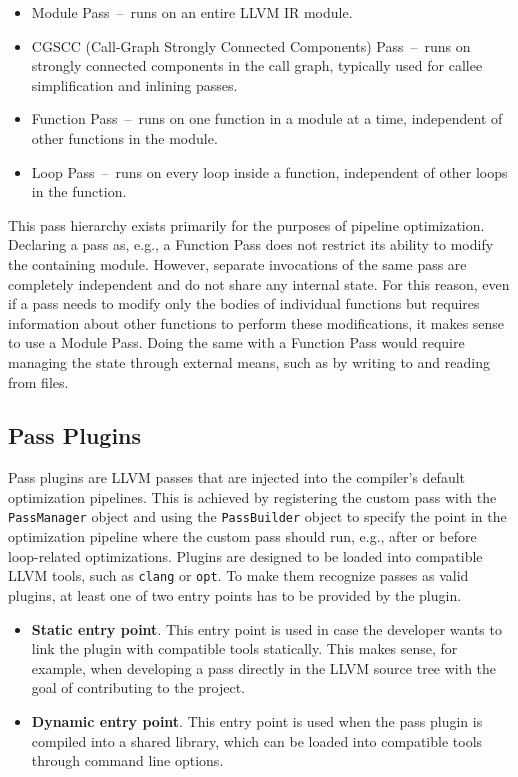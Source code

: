 \begin{itemize}
    \item Module Pass \,--\, runs on an entire LLVM IR module.
    \item CGSCC (Call-Graph Strongly Connected Components) Pass \,--\, runs on strongly connected components in the call graph, typically used for callee simplification and inlining passes.
    \item Function Pass \,--\, runs on one function in a module at a time, independent of other functions in the module.
    \item Loop Pass \,--\, runs on every loop inside a function, independent of other loops in the function.
\end{itemize}


This pass hierarchy exists primarily for the purposes of pipeline optimization. Declaring a pass as, e.g., a Function Pass does not restrict its ability to modify the containing module. However, separate invocations of the same pass are completely independent and do not share any internal state. For this reason, even if a pass needs to modify only the bodies of individual functions but requires information about other functions to perform these modifications, it makes sense to use a Module Pass. Doing the same with a Function Pass would require managing the state through external means, such as by writing to and reading from files.


\subsection{Pass Plugins}
Pass plugins are LLVM passes that are injected into the compiler's default optimization pipelines. This is achieved by registering the custom pass with the \texttt{PassManager} object and using the \texttt{PassBuilder} object to specify the point in the optimization pipeline where the custom pass should run, e.g., after or before loop-related optimizations. Plugins are designed to be loaded into compatible LLVM tools, such as \texttt{clang} or \texttt{opt}. To make them recognize passes as valid plugins, at least one of two entry points has to be provided by the plugin.

\begin{itemize}
    \item \textbf{Static entry point}. This entry point is used in case the developer wants to link the plugin with compatible tools statically. This makes sense, for example, when developing a pass directly in the LLVM source tree with the goal of contributing to the project.
    \item \textbf{Dynamic entry point}. This entry point is used when the pass plugin is compiled into a shared library, which can be loaded into compatible tools through command line options. 
\end{itemize}


